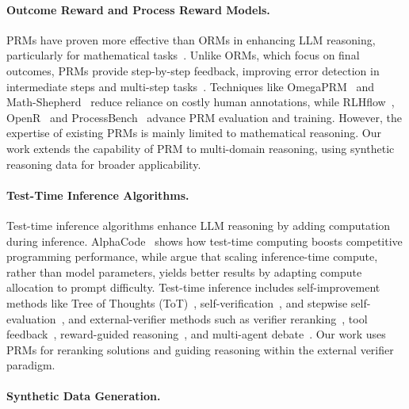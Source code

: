 
\paragraph{Outcome Reward and Process Reward Models.}
PRMs have proven more effective than ORMs in enhancing LLM reasoning, particularly for mathematical tasks~\citep{luo2024improve, lightman2023let, sun2024easy}. Unlike ORMs, which focus on final outcomes,
PRMs provide step-by-step feedback, improving error detection in intermediate steps and multi-step tasks~\citep{luo2024improve,lightman2023let, uesato2022solving, wang2024math}.
Techniques like OmegaPRM~\citep{luo2024improve} and Math-Shepherd~\citep{wang2024math} reduce reliance on costly human annotations, while RLHflow~\citep{xiong2024rlhflowmath}, OpenR~\citep{wang2024openr} and ProcessBench~\citep{zheng2024processbench} advance PRM evaluation and training. However, the expertise of existing PRMs is mainly limited to mathematical reasoning. Our work extends the capability of PRM to multi-domain reasoning, using synthetic reasoning data for broader applicability. 




\paragraph{Test-Time Inference Algorithms.}
Test-time inference algorithms enhance LLM reasoning by adding computation during inference. AlphaCode~\citep{li2022competition} shows how test-time computing boosts competitive programming performance, while \citet{snell2024scaling} argue that scaling inference-time compute, rather than model parameters, yields better results by adapting compute allocation to prompt difficulty. Test-time inference includes self-improvement methods like Tree of Thoughts (ToT)~\citep{yao2024tree},
self-verification~\citep{weng2022large},
and stepwise self-evaluation~\citep{xie2024self},
and external-verifier methods such as verifier reranking~\citep{cobbe2021training,feng2023alphazero}, 
tool feedback~\citep{gou2023critic},
reward-guided reasoning~\citep{yang2024reinforcing},
and multi-agent debate~\citep{du2023improving}.
Our work uses PRMs for reranking solutions and guiding reasoning within the external verifier paradigm.



\paragraph{Synthetic Data Generation.}

